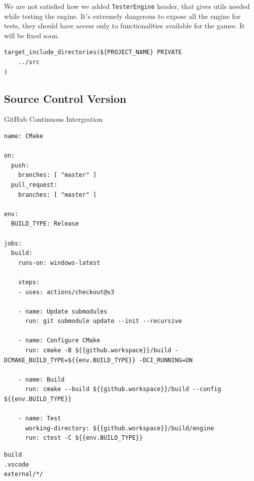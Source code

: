 We are not satisfied how we added \texttt{TesterEngine} header, that gives utils needed while testing the engine. It's extremely dangerous to expose all the engine for tests, they should have access only to functionalities available for the games. It will be fixed soon. 
\begin{lstlisting}[caption=Including common internal utils (./engine/tests/CMakeLists.txt)]
target_include_directories(${PROJECT_NAME} PRIVATE
    ../src
)
\end{lstlisting}

\subsection{Source Control Version}
\label{sec:scv}
GitHub Continuous Intergration
\label{lst:cicmake}
\begin{lstlisting}[caption=Continuous intergration's build test (./.github/workflows/.cmake.yml)]
name: CMake

on:
  push:
    branches: [ "master" ]
  pull_request:
    branches: [ "master" ]

env:
  BUILD_TYPE: Release

jobs:
  build:
    runs-on: windows-latest

    steps:
    - uses: actions/checkout@v3

    - name: Update submodules
      run: git submodule update --init --recursive

    - name: Configure CMake
      run: cmake -B ${{github.workspace}}/build -DCMAKE_BUILD_TYPE=${{env.BUILD_TYPE}} -DCI_RUNNING=ON

    - name: Build
      run: cmake --build ${{github.workspace}}/build --config ${{env.BUILD_TYPE}}

    - name: Test
      working-directory: ${{github.workspace}}/build/engine
      run: ctest -C ${{env.BUILD_TYPE}}
\end{lstlisting}

\begin{lstlisting}[caption=\texttt{.gitignore} (./.gitignore)]
build
.vscode
external/*/
\end{lstlisting}